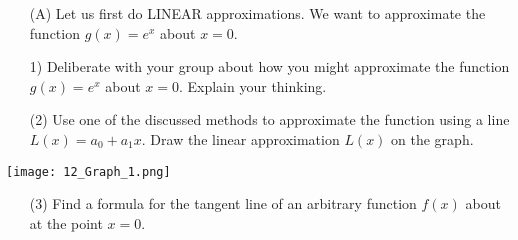 \documentclass[10 pt]{article}
\begin{document}
\begin{itemize}
	\item[(A)] Let us first do LINEAR approximations. We want to approximate the function $g(x) = e^x$ about $x = 0$.
\end{itemize}
	\begin{minipage}{0.55\textwidth}
	\begin{itemize}
\item[1)] Deliberate with your group about how you might approximate the function $g(x) = e^x$ about $x = 0$. Explain your thinking.
\vspace{ 3 cm}
\item[(2)] Use one of the discussed methods to approximate the
function using a line $L(x) = a_0 + a_1x$. Draw the linear
approximation $L(x)$ on the graph.
\end{itemize}
\end{minipage}
\begin{minipage}{0.7 \textwidth}
	\texttt{[image: 12\_Graph\_1.png]}
\end{minipage}
\begin{itemize}
	\vspace{ 2 cm}
\item[(3)]Find a formula for the tangent line of an arbitrary function $f(x)$ about at the point $x = 0$.
\vspace{ 3 cm}
\end{itemize}
\end{document}
